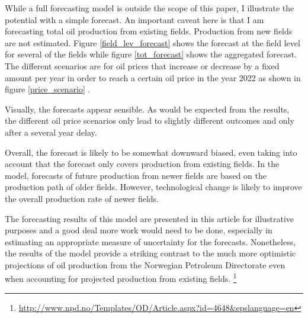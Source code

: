 \documentclass[12pt]{article}
\begin{document}
While a full forecasting model is outside the scope of this paper, I illustrate the potential with a simple forecast.  An important caveat here is that I am forecasting total oil production from existing fields.  Production from new fields are not estimated.  Figure \ref{field_lev_forecast} shows the forecast at the field level for several of the fields while figure \ref{tot_forecast} shows the aggregated forecast.  The different scenarios are for oil prices that increase or decrease by a fixed amount per year in order to reach a certain oil price in the year 2022 as shown in figure \ref{price_scenario} .  

Visually, the forecasts appear sensible.  As would be expected from the results, the different oil price scenarios only lead to slightly different outcomes and only after a several year delay.

Overall, the forecast is likely to be somewhat downward biased, even taking into account that the forecast only covers production from existing fields.  In the model, forecasts of future production from newer fields are based on the production path of older fields.  However, technological change is likely to improve the overall production rate of newer fields.

The forecasting results of this model are presented in this article for illustrative purposes and a good deal more work would need to be done, especially in estimating an appropriate measure of uncertainty for the forecasts.  Nonetheless, the results of the model provide a striking contrast to the much more optimistic projections of oil production from the Norwegian Petroleum Directorate even when accounting for projected production from existing fields. \footnote{\url{http://www.npd.no/Templates/OD/Article.aspx?id=4648&epslanguage=en}}

\begin{spacing}{1}




\end{spacing}

\FloatBarrier

\appendix
\end{document}
